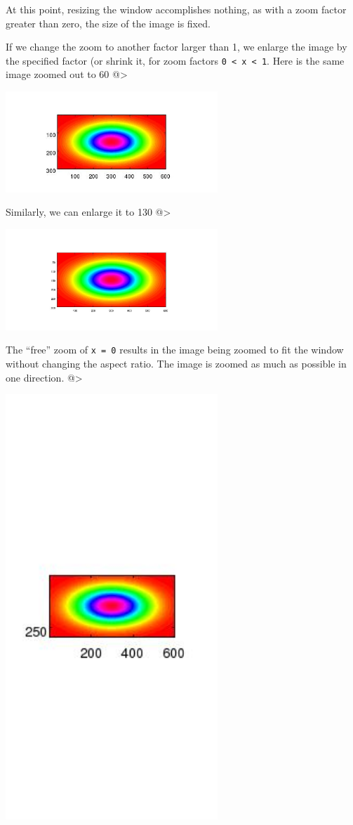 At this point, resizing the window accomplishes nothing, as with a zoom factor 
greater than zero, the size of the image is fixed.

If we change the zoom to another factor larger than 1, we enlarge the image by
the specified factor (or shrink it, for zoom factors \verb|0 < x < 1|.  Here is the
same image zoomed out to 60%
@>


\centerline{\includegraphics[width=8cm]{zoom3}}


Similarly, we can enlarge it to 130%
@>


\centerline{\includegraphics[width=8cm]{zoom4}}


The ``free'' zoom of \verb|x = 0| results in the image being zoomed to fit the window
without changing the aspect ratio.  The image is zoomed as much as possible in
one direction.
@>


\centerline{\includegraphics[width=8cm]{zoom5}}



